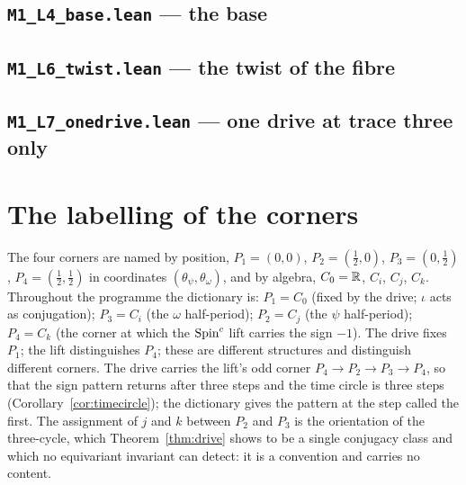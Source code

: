 \documentclass[11pt,a4paper]{article}
\theoremstyle{plain}
\theoremstyle{definition}
\theoremstyle{remark}
\begin{document}
\subsection*{\texttt{M1\_L4\_base.lean} --- the base}


\subsection*{\texttt{M1\_L6\_twist.lean} --- the twist of the fibre}


\subsection*{\texttt{M1\_L7\_onedrive.lean} --- one drive at trace three only}


\section{The labelling of the corners}\label{app:labels}

The four corners are named by position, $P_{1}=(0,0)$, $P_{2}=(\tfrac12,0)$, $P_{3}=(0,\tfrac12)$, $P_{4}=(\tfrac12,\tfrac12)$ in coordinates $(\theta_{\psi},\theta_{\omega})$, and by algebra, $C_{0}=\mathbb{R}$, $C_{i}$, $C_{j}$, $C_{k}$. Throughout the programme the dictionary is: $P_{1}=C_{0}$ (fixed by the drive; $\iota$ acts as conjugation); $P_{3}=C_{i}$ (the $\omega$ half-period); $P_{2}=C_{j}$ (the $\psi$ half-period); $P_{4}=C_{k}$ (the corner at which the $\text{Spin}^c$ lift carries the sign $-1$). The drive fixes $P_{1}$; the lift distinguishes $P_{4}$; these are different structures and distinguish different corners. The drive carries the lift's odd corner $P_{4}\to P_{2}\to P_{3}\to P_{4}$, so that the sign pattern returns after three steps and the time circle is three steps (Corollary~\ref{cor:timecircle}); the dictionary gives the pattern at the step called the first. The assignment of $j$ and $k$ between $P_{2}$ and $P_{3}$ is the orientation of the three-cycle, which Theorem~\ref{thm:drive} shows to be a single conjugacy class and which no equivariant invariant can detect: it is a convention and carries no content.
\end{document}
